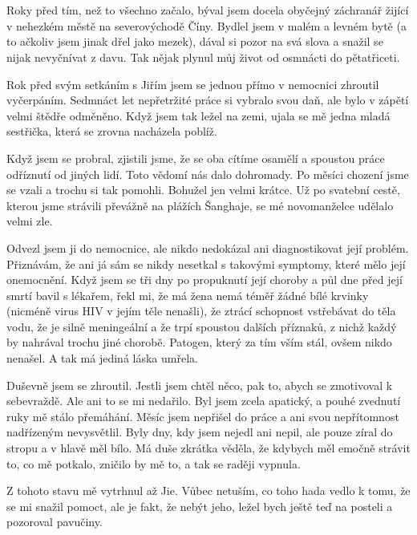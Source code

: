 \chapter{}
Roky před tím, než to všechno začalo, býval jsem docela obyčejný záchranář žijící v nehezkém městě na severovýchodě Číny. Bydlel jsem v malém a levném bytě (a to ačkoliv jsem jinak dřel jako mezek), dával si pozor na svá slova a snažil se nijak nevyčnívat z davu. Tak nějak plynul můj život od osmnácti do pětatřiceti.

Rok před svým setkáním s Jiřím jsem se jednou přímo v nemocnici zhroutil vyčerpáním. Sedmnáct let nepřetržité práce si vybralo svou daň, ale bylo v zápětí velmi štědře odměněno. Když jsem tak ležel na zemi, ujala se mě jedna mladá sestřička, která se zrovna nacházela poblíž.
 
Když jsem se probral, zjistili jsme, že se oba cítíme osamělí a spoustou práce odříznutí od jiných lidí. Toto vědomí nás dalo dohromady. Po měsíci chození jsme se vzali a trochu si tak pomohli. Bohužel jen velmi krátce. Už po svatební cestě, kterou jsme strávili převážně na plážích Šanghaje, se mé novomanželce udělalo velmi zle.

Odvezl jsem ji do nemocnice, ale nikdo nedokázal ani diagnostikovat její problém. Přiznávám, že ani já sám se nikdy nesetkal s takovými symptomy, které mělo její onemocnění. Když jsem se tři dny po propuknutí její choroby a půl dne před její smrtí bavil s lékařem, řekl mi, že má žena nemá téměř žádné bílé krvinky (nicméně virus HIV v jejím těle nenašli), že ztrácí schopnost vstřebávat do těla vodu, že je silně meningeální a že trpí spoustou dalších příznaků, z nichž každý by nahrával trochu jiné chorobě. Patogen, který za tím vším stál, ovšem nikdo nenašel. A tak má jediná láska umřela.
\vspace{0.75cm}


Duševně jsem se zhroutil. Jestli jsem chtěl něco, pak to, abych se zmotivoval k sebevraždě. Ale ani to se mi nedařilo. Byl jsem zcela apatický, a pouhé zvednutí ruky mě stálo přemáhání. Měsíc jsem nepřišel do práce a ani svou nepřítomnost nadřízeným nevysvětlil. Byly dny, kdy jsem nejedl ani nepil, ale pouze zíral do stropu a v hlavě měl bílo. Má duše zkrátka věděla, že kdybych měl emočně strávit to, co mě potkalo, zničilo by mě to, a tak se raději vypnula.

Z tohoto stavu mě vytrhnul až Jie. Vůbec netuším, co toho hada vedlo k tomu, že se mi snažil pomoct, ale je fakt, že nebýt jeho, ležel bych ještě teď na posteli a pozoroval pavučiny. 
	
